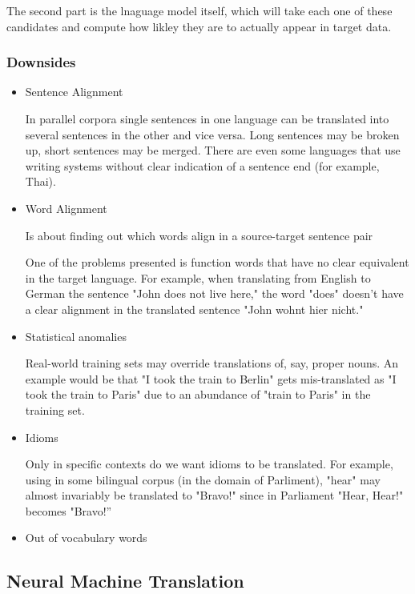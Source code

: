 \documentclass[11pt]{article}
\begin{document}
The second part is the lnaguage model itself, which will take each one of these candidates and compute how likley they are to actually appear in target data.

\subsubsection{Downsides}

\begin{itemize}
    \item Sentence Alignment
    
    In parallel corpora single sentences in one language can be translated into
    several sentences in the other and vice versa. Long sentences may be
    broken up, short sentences may be merged. There are even some
    languages that use writing systems without clear indication of a sentence
    end (for example, Thai).

    \item Word Alignment
    
    Is about finding out which words align in a source-target sentence pair

    One of the problems presented is function words that have no clear
    equivalent in the target language. For example, when translating from
    English to German the sentence "John does not live here," the word
    "does" doesn't have a clear alignment in the translated sentence "John
    wohnt hier nicht."

    \item Statistical anomalies
    
    Real-world training sets may override translations of, say, proper nouns.
    An example would be that "I took the train to Berlin" gets mis-translated as
    "I took the train to Paris" due to an abundance of "train to Paris" in the
    training set.

    \item Idioms
    
    Only in specific contexts do we want idioms to be translated. For example,
    using in some bilingual corpus (in the domain of Parliment), "hear" may
    almost invariably be translated to "Bravo!" since in Parliament "Hear,
    Hear!" becomes "Bravo!”

    \item Out of vocabulary words
\end{itemize}

\subsection{Neural Machine Translation}
\end{document}

